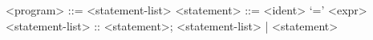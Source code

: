 \documentclass{report}
\begin{document}
\setlength{\grammarparsep}{12pt} %
\setlength{\grammarindent}{12em} %

\begin{grammar}

<program> ::= <statement-list>
<statement> ::= <ident> `=' <expr>
<statement-list> :: <statement>; <statement-list> | <statement>

\end{grammar}
\end{document}
